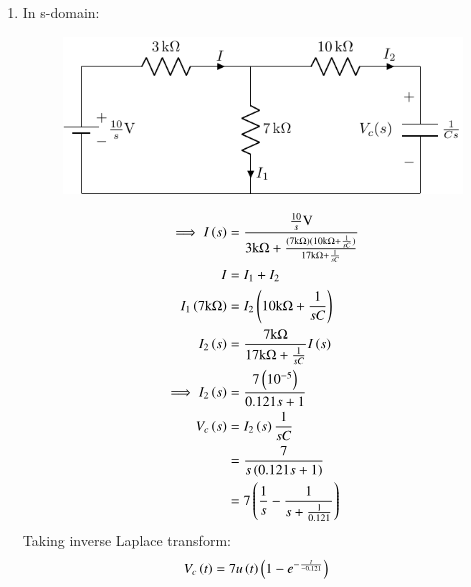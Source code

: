 \documentclass[journal,12pt,twocolumn]{IEEEtran}
\theoremstyle{remark}
\begin{document}
\begin{enumerate}
\item In s-domain:
\begin{figure}[h!]
    \centering
    \includegraphics[width=\columnwidth]{figs/c_fig2.pdf}
\end{figure}
\begin{align}
\implies I\left(s\right) &= \frac{\frac{10}{s}\text{V}}{3\text{k}\ohm + \frac{(7\text{k}\ohm)(10\text{k}\ohm + \frac{1}{sC})}{17\text{k}\ohm + \frac{1}{sC}}} \\
I &= I_1 + I_2 \\
I_1\left(7\text{k}\ohm\right) &= I_2\left(10\text{k}\ohm + \frac{1}{sC}\right) \\
I_2\left(s\right) &= \frac{7\text{k}\ohm}{17\text{k}\ohm + \frac{1}{sC}}I\left(s\right) \\
\implies I_2\left(s\right) &= \frac{7\left(10^{-5}\right)}{0.121s + 1} \\
V_c\left(s\right) &= I_2\left(s\right)\frac{1}{sC} \\
&= \frac{7}{s\left(0.121s + 1\right)} \\
&= 7\left(\frac{1}{s} - \frac{1}{s + \frac{1}{0.121}}\right)
\end{align}
Taking inverse Laplace transform:
\begin{align}
V_c\left(t\right) &= 7u\left(t\right)\left(1 - e^{-\frac{t}{-0.121}}\right)
\end{align}


\end{enumerate}
\end{document}
